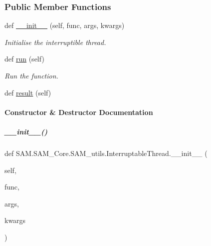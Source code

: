 \subsubsection*{Public Member Functions}
\begin{DoxyCompactItemize}
\item 
def \hyperlink{group__icubclient__SAM__utils_a0797d5d722f29957fa9639aee0211e21}{\+\_\+\+\_\+init\+\_\+\+\_\+} (self, func, args, kwargs)
\begin{DoxyCompactList}\small\item\em Initialise the interruptible thread. \end{DoxyCompactList}\item 
def \hyperlink{group__icubclient__SAM__utils_a1b57a578c33317f182ac877e3b8ecdd7}{run} (self)
\begin{DoxyCompactList}\small\item\em Run the function. \end{DoxyCompactList}\item 
def \hyperlink{group__icubclient__SAM__utils_a707acf5e3b465ea2755b2239e5d1b2f6}{result} (self)
\end{DoxyCompactItemize}


\paragraph{Constructor \& Destructor Documentation}
\mbox{\label{group__icubclient__SAM__utils_a0797d5d722f29957fa9639aee0211e21}} 
\subparagraph{\texorpdfstring{\+\_\+\+\_\+init\+\_\+\+\_\+()}{\_\_init\_\_()}}
{\footnotesize\ttfamily def S\+A\+M.\+S\+A\+M\+\_\+\+Core.\+S\+A\+M\+\_\+utils.\+Interruptable\+Thread.\+\_\+\+\_\+init\+\_\+\+\_\+ (\begin{DoxyParamCaption}\item[{}]{self,  }\item[{}]{func,  }\item[{}]{args,  }\item[{}]{kwargs }\end{DoxyParamCaption})}



